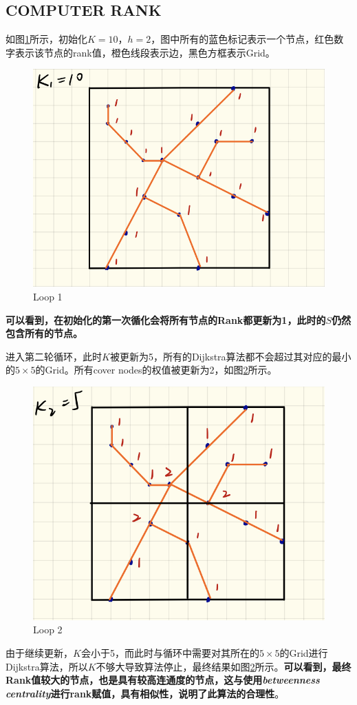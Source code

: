 \documentclass{ML}
\begin{document}
\subsection{COMPUTER RANK}
如图\ref{fig:example loop 1}所示，初始化$K=10$，$h=2$，图中所有的蓝色标记表示一个节点，红色数字表示该节点的rank值，橙色线段表示边，黑色方框表示Grid。
\begin{figure}[htb]
	\centering
	\includegraphics[width=0.7\linewidth]{media/example-1.jpg}
	\caption{Loop 1}\label{fig:example loop 1}
\end{figure}

\textbf{可以看到，在初始化的第一次循化会将所有节点的Rank都更新为1，此时的$S$仍然包含所有的节点。}

进入第二轮循环，此时$K$被更新为5，所有的Dijkstra算法都不会超过其对应的最小的$5 \times 5$的Grid。所有cover nodes的权值被更新为2，如图\ref{fig:example loop 2}所示。
\begin{figure}[htb]
	\centering
	\includegraphics[width=0.7\linewidth]{media/example-2.jpg}
	\caption{Loop 2}\label{fig:example loop 2}
\end{figure}

由于继续更新，$K$会小于5，而此时与循环中需要对其所在的$5 \times 5$的Grid进行Dijkstra算法，所以$K$不够大导致算法停止，最终结果如图\ref{fig:example loop 2}所示。\textbf{可以看到，最终Rank值较大的节点，也是具有较高连通度的节点，这与使用\textit{betweenness centrality}进行rank赋值，具有相似性，说明了此算法的合理性}。
\end{document}
